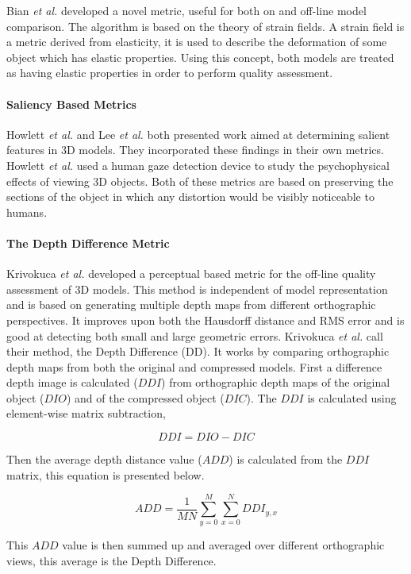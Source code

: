 Bian \textit{et al.} \cite{Bian09Evaluation} developed a novel metric, useful for both on and off-line model comparison. The algorithm is based on the theory of strain fields. A strain field is a metric derived from elasticity, it is used to describe the deformation of some object which has elastic properties. Using this concept, both models are treated as having elastic properties in order to perform quality assessment.

\paragraph{Saliency Based Metrics}

Howlett \textit{et al.} \cite{Howlett04Experimental} and Lee \textit{et al.} \cite{Lee05Mesh} both presented work aimed at determining salient features in 3D models. They incorporated these findings in their own metrics. Howlett \textit{et al.} used a human gaze detection device to study the psychophysical effects of viewing 3D objects. Both of these metrics are based on preserving the sections of the object in which any distortion would be visibly noticeable to humans.

\paragraph{The Depth Difference Metric}

Krivokuca \textit{et al.} \cite{Krivokuca12New} developed a perceptual based metric for the off-line quality assessment of 3D models. This method is independent of model representation and is based on generating multiple depth maps from different orthographic perspectives. It improves upon both the Hausdorff distance and RMS error and is good at detecting both small and large geometric errors. Krivokuca \textit{et al.} call their method, the Depth Difference (DD). It works by comparing orthographic depth maps from both the original and compressed models. First a difference depth image is calculated ($DDI$) from orthographic depth maps of the original object ($DIO$) and of the compressed object ($DIC$). The $DDI$ is calculated using element-wise matrix subtraction,

$$
DDI = DIO - DIC
$$

Then the average depth distance value ($ADD$) is calculated from the $DDI$ matrix, this equation is presented below.

$$
ADD = \frac{1}{MN} \sum_{y=0}^{M} \sum_{x=0}^{N} DDI_{y,x}
$$

This $ADD$ value is then summed up and averaged over different orthographic views, this average is the Depth Difference.

